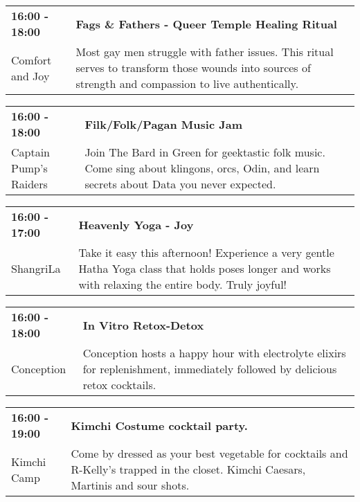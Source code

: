 \begin{tabular}{ p{1in} p{2.2in} }
    \textbf{16:00 - 18:00} & \textbf{Fags \& Fathers - Queer Temple Healing Ritual} \\
    Comfort and Joy \newline  & Most gay men struggle with father issues. This ritual serves to transform those wounds into sources of strength and compassion to live authentically. \\
    \hline 
\end{tabular}
    
\begin{tabular}{ p{1in} p{2.2in} }
    \textbf{16:00 - 18:00} & \textbf{Filk/Folk/Pagan Music Jam} \\
    Captain Pump's Raiders \newline  & Join The Bard in Green for geektastic folk music. Come sing about klingons, orcs, Odin, and learn secrets about Data you never expected. \\
    \hline 
\end{tabular}
    
\begin{tabular}{ p{1in} p{2.2in} }
    \textbf{16:00 - 17:00} & \textbf{Heavenly Yoga - Joy} \\
    ShangriLa \newline  & Take it easy this afternoon! Experience a very gentle Hatha Yoga class that holds poses longer and works with relaxing the entire body. Truly joyful! \\
    \hline 
\end{tabular}
    
\begin{tabular}{ p{1in} p{2.2in} }
    \textbf{16:00 - 18:00} & \textbf{In Vitro Retox-Detox} \\
    Conception \newline  & Conception hosts a happy hour with electrolyte elixirs for replenishment, immediately followed by delicious retox cocktails. \\
    \hline 
\end{tabular}
    
\begin{tabular}{ p{1in} p{2.2in} }
    \textbf{16:00 - 19:00} & \textbf{Kimchi Costume cocktail party.} \\
    Kimchi Camp \newline  & Come by dressed as your best vegetable for cocktails and R-Kelly's trapped in the closet. Kimchi Caesars, Martinis and sour shots. \\
    \hline 
\end{tabular}
    
